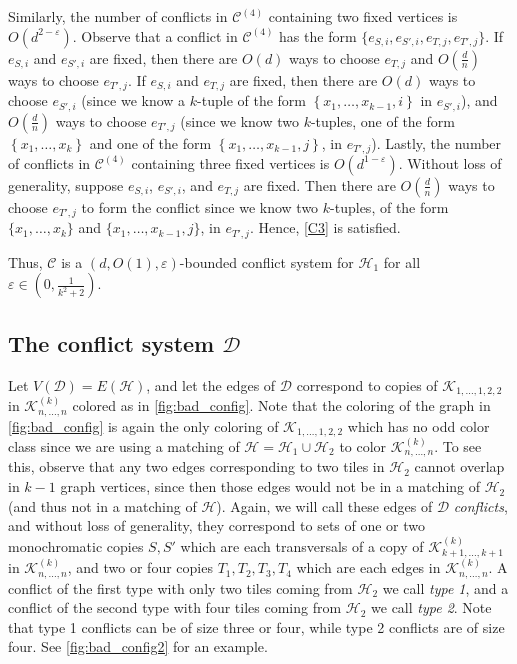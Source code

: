 \documentclass{article}
\theoremstyle{definition}
\newcommand\cH{{\mathcal H}}
\newcommand\cC{{\mathcal C}}
\newcommand{\cD}{\mathcal{D}}
\newcommand\cK{{\mathcal K}}
\begin{document}
    Similarly, the number of conflicts in $\cC^{(4)}$ containing two fixed vertices is $O(d^{2-\varepsilon})$.  Observe that a conflict in $\cC^{(4)}$ has the form $\{e_{S,i}, e_{S',i}, e_{T,j}, e_{T',j}\}$.  If $e_{S,i}$ and $e_{S',i}$ are fixed, then there are $O(d)$ ways to choose $e_{T,j}$ and $O\left(\frac{d}{n}\right)$ ways to choose $e_{T',j}$.  If $e_{S,i}$ and $e_{T,j}$ are fixed, then there are $O(d)$ ways to choose $e_{S',i}$ (since we know a $k$-tuple of the form $\left\{x_1, \dots, x_{k-1},i\right\}$ in $e_{S',i}$), and $O\left(\frac{d}{n}\right)$ ways to choose $e_{T',j}$ (since we know two $k$-tuples, one of the form $\left\{x_1,\dots, x_k\right\}$ and one of the form $\left\{x_1, \dots, x_{k-1},j\right\}$, in $e_{T',j}$).  Lastly, the number of conflicts in $\cC^{(4)}$ containing three fixed vertices is $O(d^{1-\varepsilon})$.  Without loss of generality, suppose $e_{S,i}$, $e_{S',i}$, and $e_{T,j}$ are fixed.  Then there are $O\left(\frac{d}{n}\right)$ ways to choose $e_{T',j}$ to form the conflict since we know two $k$-tuples, of the form $\{x_1, \dots, x_k\}$ and $\{x_1, \dots, x_{k-1}, j\}$, in $e_{T',j}$.  Hence, \ref{C3} is satisfied.  

    Thus, $\cC$ is a $(d,O(1), \varepsilon)$-bounded conflict system for $\cH_1$ for all $\varepsilon \in \left( 0, \frac{1}{k^2+2} \right)$.

\subsection{The conflict system $\cD$} \label{sec:hypD}

    Let $V(\cD) = E(\cH)$, and let the edges of $\cD$ correspond to copies of $\cK_{1,\dots, 1,2,2}$ in $\cK_{n,\dots,n}^{(k)}$ colored as in \cref{fig:bad_config}.  Note that the coloring of the graph in \cref{fig:bad_config} is again the only coloring of $\cK_{1,\dots,1,2,2}$ which has no odd color class since we are using a matching of $\cH = \cH_1 \cup \cH_2$ to color $\cK^{(k)}_{n,\dots, n}$.  To see this, observe that any two edges corresponding to two tiles in $\cH_2$ cannot overlap in $k-1$ graph vertices, since then those edges would not be in a matching of $\cH_2$ (and thus not in a matching of $\cH$).  Again, we will call these edges of $\cD$ \emph{conflicts}, and without loss of generality, they correspond to sets of one or two monochromatic copies $S, S'$ which are each transversals of a copy of $\cK_{k+1,\dots,k+1}^{(k)}$ in $\cK_{n,\dots,n}^{(k)}$, and two or four copies $T_1, T_2, T_3, T_4$ which are each edges in $\cK_{n,\dots,n}^{(k)}$. A conflict of the first type with only two tiles coming from $\cH_2$ we call \emph{type 1}, and a conflict of the second type with four tiles coming from $\cH_2$ we call \emph{type 2}.  Note that type 1 conflicts can be of size three or four, while type 2 conflicts are of size four. See \cref{fig:bad_config2} for an example.
\end{document}
